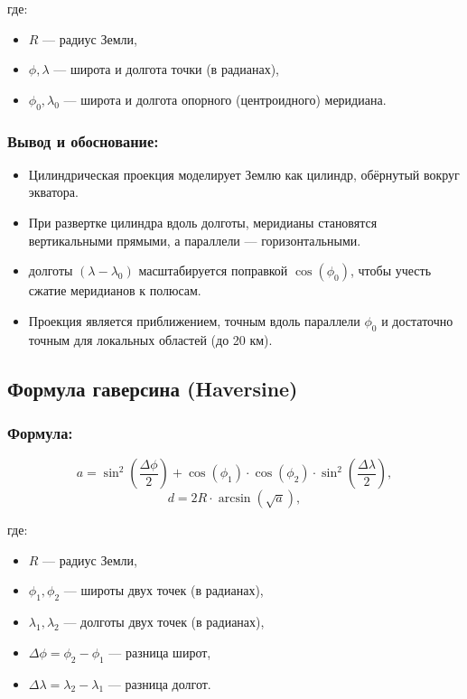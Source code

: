 \documentclass[a4paper,14pt]{extarticle}
\begin{document}
    где:
    \begin{itemize}
        \item $R$ — радиус Земли,
        \item $\phi, \lambda$ — широта и долгота точки (в радианах),
        \item $\phi_0, \lambda_0$ — широта и долгота опорного (центроидного) меридиана.
    \end{itemize}

    \subsubsection*{Вывод и обоснование:}
    \begin{itemize}
        \item Цилиндрическая проекция моделирует Землю как цилиндр, обёрнутый вокруг экватора.
        \item При развертке цилиндра вдоль долготы, меридианы становятся вертикальными прямыми, а параллели — горизонтальными.
        \item долготы $(\lambda - \lambda_0)$ масштабируется поправкой $\cos(\phi_0)$, чтобы учесть сжатие меридианов к полюсам.
        \item Проекция является приближением, точным вдоль параллели $\phi_0$ и достаточно точным для локальных областей (до 20 км).
    \end{itemize}

    \subsection*{Формула гаверсина (Haversine)}

    \subsubsection*{Формула:}
    \begin{equation}
        a = \sin^2\left(\frac{\Delta\phi}{2}\right) + \cos(\phi_1) \cdot \cos(\phi_2) \cdot \sin^2\left(\frac{\Delta\lambda}{2}\right),
    \end{equation}
    \begin{equation}
        d = 2R \cdot \arcsin\left( \sqrt{a} \right),
    \end{equation}

    где:
    \begin{itemize}
        \item $R$ — радиус Земли,
        \item $\phi_1, \phi_2$ — широты двух точек (в радианах),
        \item $\lambda_1, \lambda_2$ — долготы двух точек (в радианах),
        \item $\Delta\phi = \phi_2 - \phi_1$ — разница широт,
        \item $\Delta\lambda = \lambda_2 - \lambda_1$ — разница долгот.
    \end{itemize}
\end{document}
